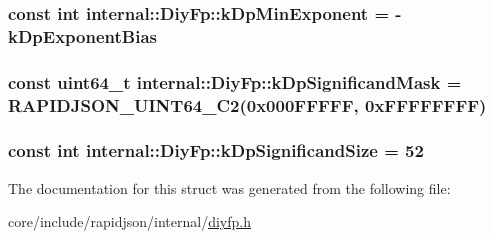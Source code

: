 \subsubsection[{\texorpdfstring{k\+Dp\+Min\+Exponent}{kDpMinExponent}}]{\setlength{\rightskip}{0pt plus 5cm}const int internal\+::\+Diy\+Fp\+::k\+Dp\+Min\+Exponent = -\/{\bf k\+Dp\+Exponent\+Bias}\hspace{0.3cm}{\ttfamily [static]}}\hypertarget{structinternal_1_1DiyFp_a9ad1b0cdbab318e45d2bc48e64707ef3}{}\label{structinternal_1_1DiyFp_a9ad1b0cdbab318e45d2bc48e64707ef3}
\subsubsection[{\texorpdfstring{k\+Dp\+Significand\+Mask}{kDpSignificandMask}}]{\setlength{\rightskip}{0pt plus 5cm}const {\bf uint64\+\_\+t} internal\+::\+Diy\+Fp\+::k\+Dp\+Significand\+Mask = {\bf R\+A\+P\+I\+D\+J\+S\+O\+N\+\_\+\+U\+I\+N\+T64\+\_\+\+C2}(0x000\+F\+F\+F\+F\+F, 0x\+F\+F\+F\+F\+F\+F\+F\+F)\hspace{0.3cm}{\ttfamily [static]}}\hypertarget{structinternal_1_1DiyFp_a841ef0ae29ccd2889e7f96aad76b0179}{}\label{structinternal_1_1DiyFp_a841ef0ae29ccd2889e7f96aad76b0179}
\subsubsection[{\texorpdfstring{k\+Dp\+Significand\+Size}{kDpSignificandSize}}]{\setlength{\rightskip}{0pt plus 5cm}const int internal\+::\+Diy\+Fp\+::k\+Dp\+Significand\+Size = 52\hspace{0.3cm}{\ttfamily [static]}}\hypertarget{structinternal_1_1DiyFp_a037aed0fa0b66af0a13657418edef19e}{}\label{structinternal_1_1DiyFp_a037aed0fa0b66af0a13657418edef19e}


The documentation for this struct was generated from the following file\+:\begin{DoxyCompactItemize}
\item 
core/include/rapidjson/internal/\hyperlink{diyfp_8h}{diyfp.\+h}\end{DoxyCompactItemize}
